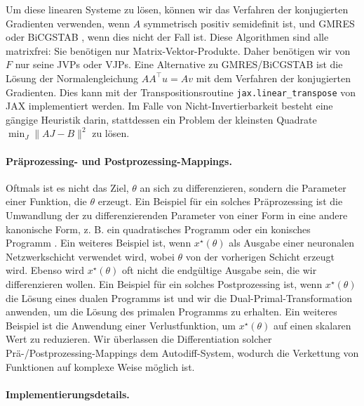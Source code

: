 Um diese linearen Systeme zu lösen, können wir das Verfahren der konjugierten Gradienten \cite{conjugate_gradient} verwenden, wenn $A$ symmetrisch positiv semidefinit ist, und GMRES \cite{saad_1986} oder BiCGSTAB \cite{Vorst1992-bicgstab}, wenn dies nicht der Fall ist. Diese Algorithmen sind alle matrixfrei: Sie benötigen nur Matrix-Vektor-Produkte. Daher benötigen wir von $F$ nur seine JVPs oder VJPs.  Eine Alternative zu GMRES/BiCGSTAB ist die Lösung der Normalengleichung $A A^\top u = A v$ mit dem Verfahren der konjugierten Gradienten.  Dies kann mit der Transpositionsroutine \texttt{jax.linear\_transpose} von JAX \cite{frostig2021decomposing} implementiert werden.
Im Falle von Nicht-Invertierbarkeit besteht eine gängige Heuristik darin, stattdessen ein Problem der kleinsten Quadrate $\min_J \|AJ-B\|^2$ zu lösen.

\paragraph{Präprozessing- und Postprozessing-Mappings.}

Oftmals ist es nicht das Ziel, $\theta$ an sich zu differenzieren, sondern die Parameter einer Funktion, die $\theta$ erzeugt. Ein Beispiel für ein solches Präprozessing ist die Umwandlung der zu differenzierenden Parameter von einer Form in eine andere kanonische Form, z. B. ein quadratisches Programm \cite{amos_2017} oder ein konisches Programm \cite{agrawal_2019}. 
Ein weiteres Beispiel ist, wenn $x^\star(\theta)$ als Ausgabe einer neuronalen Netzwerkschicht verwendet wird, wobei $\theta$ von der vorherigen Schicht erzeugt wird. Ebenso wird $x^\star(\theta)$ oft nicht die endgültige Ausgabe sein, die wir differenzieren wollen.
Ein Beispiel für ein solches Postprozessing ist, wenn $x^\star(\theta)$ die Lösung eines dualen Programms ist und wir die Dual-Primal-Transformation anwenden, um die Lösung des primalen Programms zu erhalten. Ein weiteres Beispiel ist die Anwendung einer Verlustfunktion, um $x^\star(\theta)$ auf einen skalaren Wert zu reduzieren. Wir überlassen die Differentiation solcher Prä-/Postprozessing-Mappings dem Autodiff-System, wodurch die Verkettung von Funktionen auf komplexe Weise möglich ist.

\paragraph{Implementierungsdetails.}

